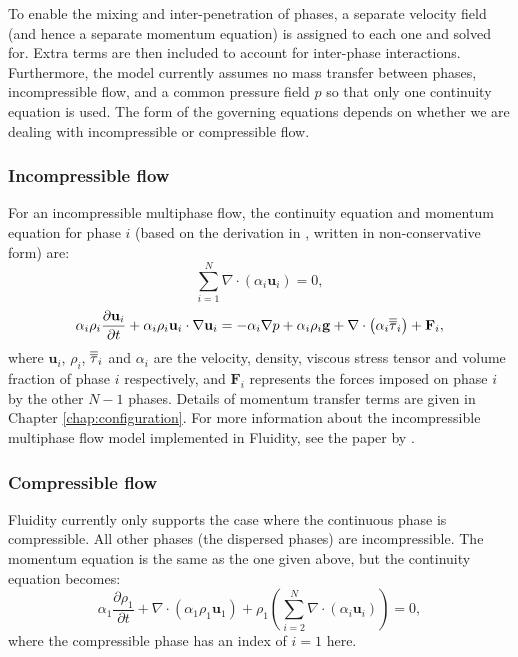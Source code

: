 To enable the mixing and inter-penetration of phases, a separate velocity field (and hence a separate momentum equation) is assigned to each one and solved for. Extra terms are then included to account for inter-phase interactions. Furthermore, the model currently assumes no mass transfer between phases, incompressible flow, and a common pressure field $p$ so that only one continuity equation is used. The form of the governing equations depends on whether we are dealing with incompressible or compressible flow.

\subsubsection{Incompressible flow}
For an incompressible multiphase flow, the continuity equation and momentum equation for phase $i$ (based on the derivation in \cite{ishii1975}, written in non-conservative form) are:
\begin{equation}
\sum_{i=1}^N\nabla\cdot\left(\alpha_i\mathbf{u}_i\right) = 0,
\end{equation}
\begin{equation}
\alpha_i\rho_i\frac{\partial \mathbf{u}_i}{\partial t} +
\alpha_i\rho_i\mathbf{u}_i\cdot\nabla\mathbf{u}_i =
-\alpha_i\nabla p + \alpha_i\rho_i\mathbf{g} +
\nabla\cdot\left(\alpha_i\overline{\overline{\tau}}_i\right) +
\mathbf{F}_i,
\end{equation}
where $\mathbf{u}_i$, $\rho_i$, $\overline{\overline{\tau}}_i$ and $\alpha_i$ are the velocity, density, viscous stress tensor and volume fraction of phase $i$ respectively, and $\mathbf{F}_i$ represents the forces imposed on phase $i$ by the other $N-1$ phases. Details of momentum transfer terms are given in Chapter \ref{chap:configuration}. For more information about the incompressible multiphase flow model implemented in Fluidity, see the paper by \cite{Jacobs_etal_2013}.

\subsubsection{Compressible flow}
Fluidity currently only supports the case where the continuous phase is compressible. All other phases (the dispersed phases) are incompressible. The momentum equation is the same as the one given above, but the continuity equation becomes:
\begin{equation}
\alpha_1\frac{\partial\rho_1}{\partial t} + \nabla\cdot\left(\alpha_1\rho_1\mathbf{u}_1\right) + \rho_1\left(\sum_{i=2}^N\nabla\cdot\left(\alpha_i\mathbf{u}_i\right)\right) = 0,
\end{equation}
where the compressible phase has an index of $i=1$ here.

